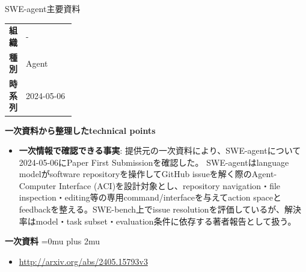 \Needspace{0.38\textheight}
\begin{technicalnote}{SWE-agent}{主要資料}
\begingroup
\begin{tabularx}{\linewidth}{@{}>{\bfseries}p{0.22\linewidth}X@{}}
組織 & - \\
種別 & Agent \\
時系列 & 2024-05-06 \\
\end{tabularx}
\smallskip
\begin{minipage}{\linewidth}
{\bfseries 一次資料から整理したtechnical points}
\begin{itemize}[leftmargin=1.5em,itemsep=0.35em]
\item \textbf{一次情報で確認できる事実}: 提供元の一次資料により、SWE-agentについて2024-05-06にPaper First Submissionを確認した。 SWE-agentはlanguage modelがsoftware repositoryを操作してGitHub issueを解く際のAgent-Computer Interface (ACI)を設計対象とし、repository navigation・file inspection・editing等の専用command/interfaceを与えてaction spaceとfeedbackを整える。SWE-bench上でissue resolutionを評価しているが、解決率はmodel・task subset・evaluation条件に依存する著者報告として扱う。
\end{itemize}
\begin{minipage}{\linewidth}
\begin{samepage}
{\bfseries 一次資料}
\begingroup\sloppy
\Urlmuskip=0mu plus 2mu\relax
\begin{itemize}[leftmargin=1.5em,itemsep=0.25em]
\item {\scriptsize\url{http://arxiv.org/abs/2405.15793v3}}
\end{itemize}
\endgroup
\end{samepage}
\end{minipage}
\end{minipage}
\endgroup
\end{technicalnote}
\medskip

